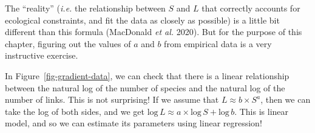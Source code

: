 \documentclass[
  letterpaper,
]{scrbook}
\begin{document}
The ``reality'' (\emph{i.e.} the relationship between \(S\) and \(L\)
that correctly accounts for ecological constraints, and fit the data as
closely as possible) is a little bit different than this formula
(MacDonald \emph{et al.} 2020). But for the purpose of this chapter,
figuring out the values of \(a\) and \(b\) from empirical data is a very
instructive exercise.

In Figure~\ref{fig-gradient-data}, we can check that there is a linear
relationship between the natural log of the number of species and the
natural log of the number of links. This is not surprising! If we assume
that \(L \approx b\times S^a\), then we can take the log of both sides,
and we get
\(\text{log}\, L \approx a \times \text{log}\, S + \text{log}\,b\). This
is linear model, and so we can estimate its parameters using linear
regression!

{
\makeatletter
\def\LT@makecaption#1#2#3{%
  \noalign{\smash{\hbox{\kern\textwidth\rlap{\kern\marginparsep
  \parbox[t]{\marginparwidth}{%
    \footnotesize{%
      \vspace{(1.1\baselineskip)}
    #1{#2: }\ignorespaces #3}}}}}}%
    }
\makeatother

\begin{figure}[bt]



\end{figure}%

}
\end{document}

